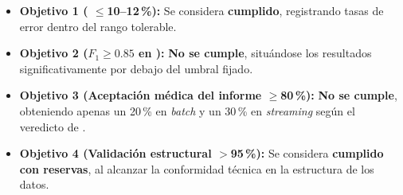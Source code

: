 \begin{itemize}
    \item \textbf{Objetivo 1 ( $\le$10--12\,\%):} Se considera \textbf{cumplido}, registrando tasas de error dentro del rango tolerable.
    \item \textbf{Objetivo 2 ($F_1 \ge 0.85$ en ):} \textbf{No se cumple}, situándose los resultados significativamente por debajo del umbral fijado.
    \item \textbf{Objetivo 3 (Aceptación médica del informe $\ge$80\,\%):} \textbf{No se cumple}, obteniendo apenas un 20\,\% en \textit{batch} y un 30\,\% en \textit{streaming} según el veredicto de .
    \item \textbf{Objetivo 4 (Validación estructural  $>$95\,\%):} Se considera \textbf{cumplido con reservas}, al alcanzar la conformidad técnica en la estructura de los datos.
\end{itemize}


